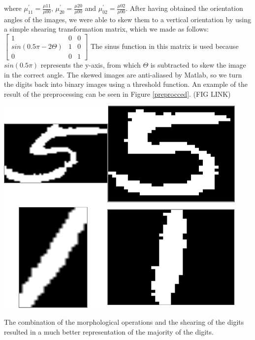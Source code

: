 \documentclass[11pt,twoside,a4paper]{article}
\begin{document}
where $\mu_{11}^{'} = \frac{\mu{11}}{\mu{00}}$, $\mu_{20}^{'} = \frac{\mu{20}}{\mu{00}}$ and $\mu_{02}^{'} = \frac{\mu{02}}{\mu{00}}$.
\newline\newline
After having obtained the orientation angles of the images, we were able to skew them to a vertical orientation by using a simple shearing transformation matrix, which we made as follows:
\newline\newline
$\begin{bmatrix}
       1                       & 0           & 0           \\[0.3em]
       sin(0.5\pi - 2\Theta)   & 1           & 0		   \\[0.3em]
       0                       & 0           & 1
\end{bmatrix}$
\newline\newline\newline
The sinus function in this matrix is used because $sin(0.5\pi)$ represents the y-axis, from which $\Theta$ is subtracted to skew the image in the correct angle. The skewed images are anti-aliased by Matlab, so we turn the digits back into binary images using a threshold function. An example of the result of the preprocessing can be seen in Figure \ref{preprocced}. (FIG LINK)

\includegraphics{preprocced.png}

The combination of the morphological operations and the shearing of the digits resulted in a much better representation of the majority of the digits.\\
\end{document}
